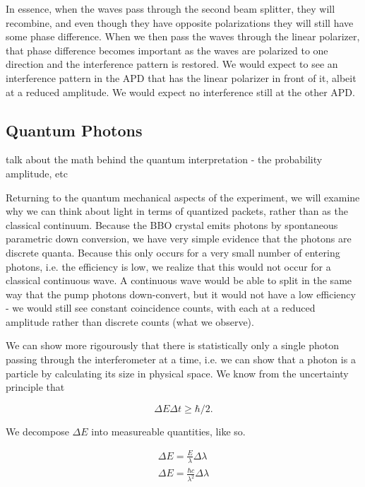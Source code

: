 \documentclass{article}
\begin{document}
	In essence, when the waves pass through the second beam splitter, they will recombine, and even though they have opposite polarizations they will still have some phase difference.  When we then pass the waves through the linear polarizer, that phase difference becomes important as the waves are polarized to one direction and the interference pattern is restored.  We would expect to see an interference pattern in the APD that has the linear polarizer in front of it, albeit at a reduced amplitude.  We would expect no interference still at the other APD.

	\subsection{Quantum Photons}
	talk about the math behind the quantum interpretation - the probability amplitude, etc

	Returning to the quantum mechanical aspects of the experiment, we will examine why we can think about light in terms of quantized packets, rather than as the classical continuum.  Because the BBO crystal emits photons by spontaneous parametric down conversion, we have very simple evidence that the photons are discrete quanta.  Because this only occurs for a very small number of entering photons, i.e. the efficiency is low, we realize that this would not occur for a classical continuous wave.  A continuous wave would be able to split in the same way that the pump photons down-convert, but it would not have a low efficiency - we would still see constant coincidence counts, with each at a reduced amplitude rather than discrete counts (what we observe).

	\hspace{.5cm}

	We can show more rigourously that there is statistically only a single photon passing through the interferometer at a time, i.e. we can show that a photon is a particle by calculating its size in physical space.  We know from the uncertainty principle that

	\begin{equation*}
		\Delta E \Delta t \geq \hbar/2.
	\end{equation*}

	We decompose $\Delta E$ into measureable quantities, like so.

	\begin{gather*}
		\Delta E = \frac{E}{\lambda} \Delta \lambda \\
		\Delta E = \frac{\hbar c}{\lambda^2}\Delta \lambda
	\end{gather*}
\end{document}
